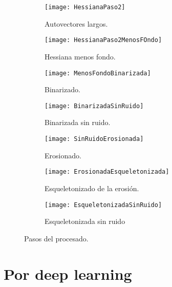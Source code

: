 \begin{figure}
	\begin{subfigure}[c]{.5\linewidth}
	\centering\large \texttt{[image: HessianaPaso2]}
	\caption{Autovectores largos.}
	\end{subfigure}%
	\begin{subfigure}[c]{.5\linewidth}
	\centering\large \texttt{[image: HessianaPaso2MenosFOndo]}
	\caption{Hessiana menos fondo.}
	\end{subfigure}%

	\begin{subfigure}[c]{.5\linewidth}
	\centering\large \texttt{[image: MenosFondoBinarizada]}
	\caption{Binarizado.}
	\end{subfigure}%
	\begin{subfigure}[c]{.5\linewidth}
	\centering\large \texttt{[image: BinarizadaSinRuido]}
	\caption{Binarizada sin ruido.}
	\end{subfigure}%

	\begin{subfigure}[c]{.5\linewidth}
	\centering\large \texttt{[image: SinRuidoErosionada]}
	\caption{Erosionado.}
	\end{subfigure}%
	\begin{subfigure}[c]{.5\linewidth}
	\centering\large \texttt{[image: ErosionadaEsqueletonizada]}
	\caption{Esqueletonizado de la erosión.}
	\end{subfigure}%
	
	\begin{subfigure}[c]{.5\linewidth}
	\centering\large \texttt{[image: EsqueletonizadaSinRuido]}
	\caption{Esqueletonizada sin ruido}
	\end{subfigure}%

\caption{Pasos del procesado.}\label{fig:2.2}
\end{figure}







\section{Por deep learning}
